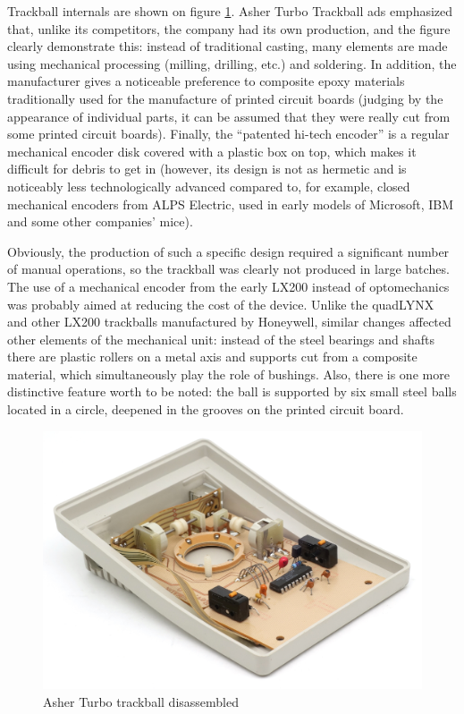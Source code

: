 \documentclass[11pt, a4paper]{article}
\begin{document}
Trackball internals are shown on figure \ref{fig:AsherInside}. Asher Turbo Trackball ads emphasized that, unlike its competitors, the company had its own production, and the figure clearly demonstrate this: instead of traditional casting, many elements are made using mechanical processing (milling, drilling, etc.) and soldering. In addition, the manufacturer gives a noticeable preference to composite epoxy materials traditionally used for the manufacture of printed circuit boards (judging by the appearance of individual parts, it can be assumed that they were really cut from some printed circuit boards). Finally, the ``patented hi-tech encoder'' is a regular mechanical encoder disk covered with a plastic box on top, which makes it difficult for debris to get in (however, its design is not as hermetic and is noticeably less technologically advanced compared to, for example, closed mechanical encoders from ALPS Electric, used in early models of Microsoft, IBM and some other companies' mice).

Obviously, the production of such a specific design required a significant number of manual operations, so the trackball was clearly not produced in large batches.
The use of a mechanical encoder from the early LX200 instead of optomechanics was probably aimed at reducing the cost of the device. Unlike the quadLYNX and other LX200 trackballs manufactured by Honeywell, similar changes affected other elements of the mechanical unit: instead of the steel bearings and shafts there are plastic rollers on a metal axis and supports cut from a composite material, which simultaneously play the role of bushings. Also, there is one more distinctive feature worth to be noted: the ball is supported by six small steel balls located in a circle, deepened in the grooves on the printed circuit board.

\begin{figure}[h]
    \centering
    \includegraphics[scale=0.7]{1988_asher_turbo_trackball/inside_60.jpg}
    \caption{Asher Turbo trackball disassembled}
    \label{fig:AsherInside}
\end{figure}
\end{document}
